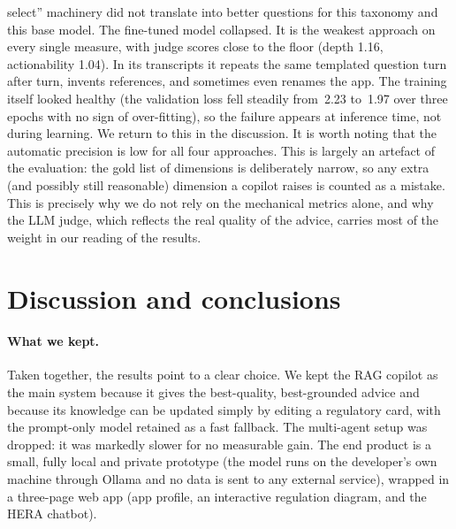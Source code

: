 \documentclass[11pt]{article}
\begin{document}
select'' machinery did not translate into better questions for this taxonomy and this base
model.
The fine-tuned model collapsed. It is the weakest approach on every single
measure, with judge scores close to the floor (depth 1.16, actionability 1.04). In its
transcripts it repeats the same templated question turn after turn, invents references,
and sometimes even renames the app. The training itself looked healthy (the validation
loss fell steadily from~2.23 to~1.97 over three epochs with no sign of over-fitting), so
the failure appears at inference time, not during learning. We return to this in the
discussion.
It is worth noting that the automatic precision is low for all four approaches.
This is largely an artefact of the evaluation: the gold list of dimensions is deliberately
narrow, so any extra (and possibly still reasonable) dimension a copilot raises is counted
as a mistake. This is precisely why we do not rely on the mechanical metrics alone, and
why the LLM judge, which reflects the real quality of the advice, carries most of the
weight in our reading of the results.
\section{Discussion and conclusions}
\label{sec:discussion}
\paragraph{What we kept.}
Taken together, the results point to a clear choice. We kept the RAG copilot as
the main system because it gives the best-quality, best-grounded advice and because its
knowledge can be updated simply by editing a regulatory card, with the prompt-only
model retained as a fast fallback. The multi-agent setup was dropped: it was markedly
slower for no measurable gain. The end product is a small, fully local and private
prototype (the model runs on the developer's own machine through Ollama and no data is
sent to any external service), wrapped in a three-page web app (app profile, an
interactive regulation diagram, and the HERA chatbot).
\end{document}
